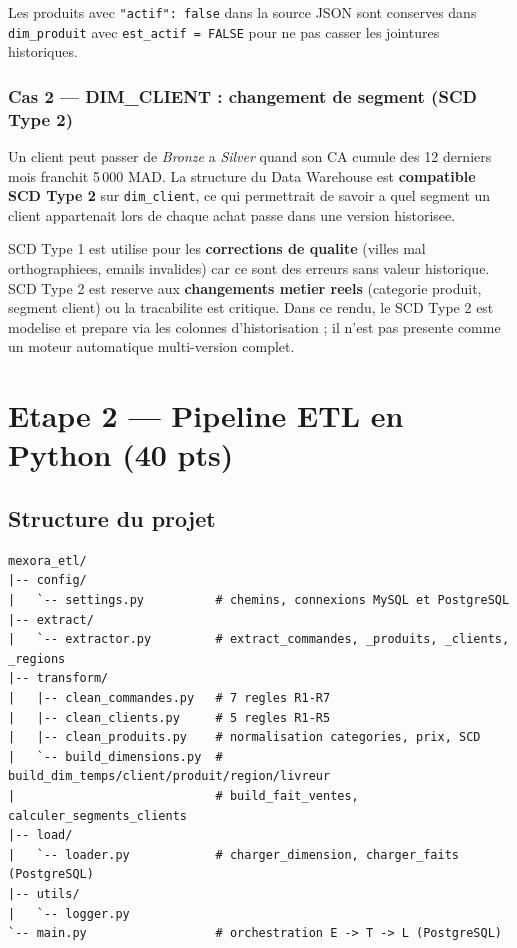 \documentclass[12pt,a4paper]{article}
\begin{document}
Les produits avec \texttt{"actif": false} dans la source JSON sont conserves dans
\texttt{dim\_produit} avec \texttt{est\_actif = FALSE} pour ne pas casser les jointures historiques.

\subsubsection{Cas 2 --- DIM\_CLIENT : changement de segment (SCD Type 2)}

Un client peut passer de \textit{Bronze} a \textit{Silver} quand son CA cumule des 12 derniers mois
franchit 5\,000 MAD. La structure du Data Warehouse est \textbf{compatible SCD Type 2} sur
\texttt{dim\_client}, ce qui permettrait de savoir a quel segment un client appartenait lors de
chaque achat passe dans une version historisee.

\begin{alertbox}[title=Choix SCD Type 1 vs Type 2]
SCD Type 1 est utilise pour les \textbf{corrections de qualite} (villes mal orthographiees, emails
invalides) car ce sont des erreurs sans valeur historique. SCD Type 2 est reserve aux
\textbf{changements metier reels} (categorie produit, segment client) ou la tracabilite est critique.
Dans ce rendu, le SCD Type 2 est modelise et prepare via les colonnes d'historisation ; il n'est
pas presente comme un moteur automatique multi-version complet.
\end{alertbox}

\newpage

\section{Etape 2 --- Pipeline ETL en Python (40 pts)}

\subsection{Structure du projet}

\begin{lstlisting}[style=bash, caption=Structure du package mexora\_etl/]
mexora_etl/
|-- config/
|   `-- settings.py          # chemins, connexions MySQL et PostgreSQL
|-- extract/
|   `-- extractor.py         # extract_commandes, _produits, _clients, _regions
|-- transform/
|   |-- clean_commandes.py   # 7 regles R1-R7
|   |-- clean_clients.py     # 5 regles R1-R5
|   |-- clean_produits.py    # normalisation categories, prix, SCD
|   `-- build_dimensions.py  # build_dim_temps/client/produit/region/livreur
|                            # build_fait_ventes, calculer_segments_clients
|-- load/
|   `-- loader.py            # charger_dimension, charger_faits (PostgreSQL)
|-- utils/
|   `-- logger.py
`-- main.py                  # orchestration E -> T -> L (PostgreSQL)
\end{lstlisting}
\end{document}
